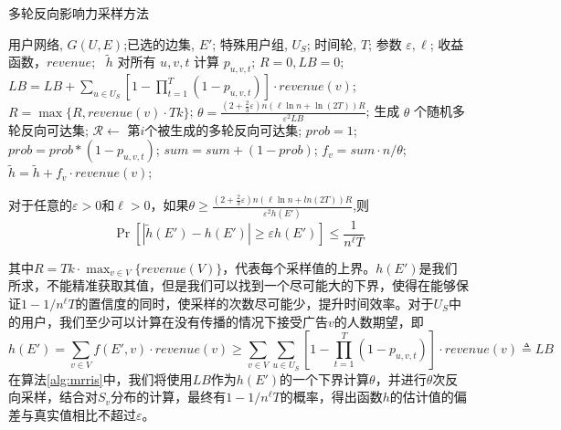 \begin{algorithm}[H]
    \renewcommand{\algorithmcfname}{算法}
    \caption{多轮反向影响力采样方法\label{alg:mrris}}
    \begin{algorithmic}[1]
    \REQUIRE 用户网络, $G(U,E)$;已选的边集, $E'$; 特殊用户组, $U_S$; 时间轮, $T$; 参数 $\varepsilon,\ell$; 收益函数，$revenue$;
    \ $\tilde{h}$
    \STATE 对所有 $u,v,t$ 计算 $p_{u,v,t}$;
    \STATE $R = 0, LB = 0$;
        \STATE $LB = LB + \sum_{u \in U_S}[1- \prod_{t=1}^{T}(1-p_{u,v,t})]\cdot revenue(v)$;
        \STATE $R = \max\{R,revenue(v)\cdot Tk\}$;
    \ENDFOR
    \STATE $\theta=\frac{(2+\frac{2}{3}\varepsilon)n(\ell\ln n+\ln(2T))R}{\varepsilon^2LB}$;
    \STATE 生成 $\theta$ 个随机多轮反向可达集;
            \STATE $\mathcal{R} \leftarrow$ 第$i$个被生成的多轮反向可达集;
            \STATE $prob = 1$;
             \label{alg:mrrisline1}
                \STATE $prob = prob*(1-p_{u,v,t})$;
            \ENDFOR
            \STATE $sum=sum+(1-prob)$;\label{alg:mrrisline2}
        \ENDFOR
        \STATE $f_v = sum \cdot n / \theta$;
        \STATE $\tilde{h}= \tilde{h} + f_v\cdot revenue(v)$;
    \ENDFOR
    \end{algorithmic}
\end{algorithm}

\begin{lemma}
\label{lem:ris}
对于任意的$\varepsilon>0$和$\ell> 0$，如果$\theta \ge \frac{(2+\frac{2}{3}\varepsilon)n(\ell\ln n+ln(2T))R}{\varepsilon^2h(E')} $,则
\begin{equation}
\Pr[|\tilde{h}(E')-h(E')|\ge \varepsilon h(E')] \le \frac{1}{n^{\ell}T}
\end{equation}
\end{lemma}
\noindent 其中$R=Tk\cdot \max_{v \in V}\{revenue(V)\}$，代表每个采样值的上界。$h(E')$是我们所求，不能精准获取其值，但是我们可以找到一个尽可能大的下界，使得在能够保证$1-1/n^\ell T$的置信度的同时，使采样的次数尽可能少，提升时间效率。对于$U_S$中的用户，我们至少可以计算在没有传播的情况下接受广告$v$的人数期望，即
\begin{equation}
    h(E')=\sum_{v\in V}f(E',v)\cdot revenue(v)\ge\sum_{v\in V}\sum_{u \in U_S}[1-\prod_{t=1}^{T}(1-p_{u,v,t})]\cdot revenue(v)\triangleq LB
\end{equation}
在算法\ref{alg:mrris}中，我们将使用$LB$作为$h(E')$的一个下界计算$\theta$，并进行$\theta$次反向采样，结合对$S_v$分布的计算，最终有$1-1/n^\ell T$的概率，得出函数$h$的估计值的偏差与真实值相比不超过$\varepsilon$。

